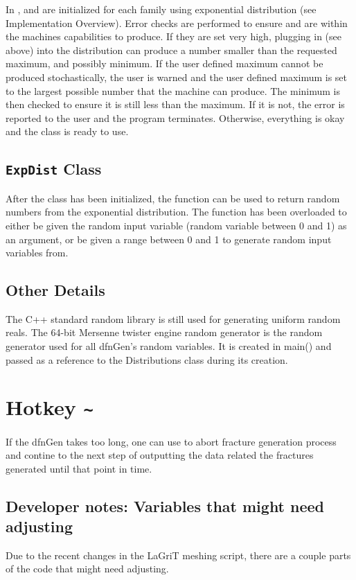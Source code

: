 \documentclass[letterpaper,10pt,english]{sphinxmanual}
\begin{document}
In ,  and  are
initialized for each family using exponential distribution (see Implementation
Overview). Error checks are performed to ensure  and
 are within the machines capabilities to produce. If they are
set very high, plugging in  (see above) into the distribution can
produce a number smaller than the requested maximum, and possibly minimum. If
the user defined maximum cannot be produced stochastically, the user is warned
and the user defined maximum is set to the largest possible number that the
machine can produce. The minimum is then checked to ensure it is still less than
the maximum. If it is not, the error is reported to the user and the program
terminates. Otherwise, everything is okay and the  class is ready to
use.


\subsection{\texttt{ExpDist} Class}
\label{dfngen:expdist-class}
After the  class has been
initialized, the  function can be used to return random numbers
from the exponential distribution. The function has been overloaded to either be
given the random input variable (random variable between 0 and 1) as an
argument, or be given a range between 0 and 1 to generate random input variables
from.


\subsection{Other Details}
\label{dfngen:other-details}
The C++ standard random library is still used for
generating uniform random reals. The 64-bit Mersenne twister engine random
generator is the random generator used for all dfnGen’s random variables. It is
created in main() and passed as a reference to the Distributions class during
its creation.


\section{Hotkey \texttt{\textasciitilde{}}}
\label{dfngen:hotkey}
If the dfnGen takes too long, one can use \code{\textasciitilde{}} to
abort fracture generation process and contine to the next step of outputting the
data related the fractures generated until that point in time.


\subsection{Developer notes: Variables that might need adjusting}
\label{dfngen:developer-notes-variables-that-might-need-adjusting}
Due to the recent changes in the LaGriT meshing script, there are a couple parts
of the code that might need adjusting.
\end{document}
